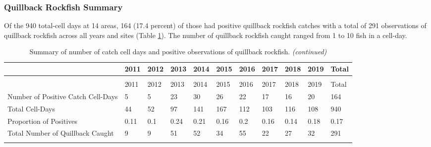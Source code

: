 \documentclass[11pt,
  english,
  a4paper,
]{article}
\begin{document}
\leavevmode\tagmcend\tagstructend\par


\hypertarget{quillback-rockfish-summary}{%
\subsubsection{Quillback Rockfish Summary}\label{quillback-rockfish-summary}}

\leavevmode\tagmcend\tagstructend


Of the 940 total-cell days at 14 areas, 164 (17.4 percent) of those had positive quillback rockfish catches with a total of 291 observations of quillback rockfish across all years and sites (Table \ref{tab:table-2}). The number of quillback rockfish caught ranged from 1 to 10 fish in a cell-day.

\leavevmode\tagmcend\tagstructend\par

\begingroup\fontsize{10}{12}\selectfont
\begingroup\fontsize{10}{12}\selectfont

\begin{longtable}[t]{>{\raggedright\arraybackslash}p{2.2cm}llllllllll}
\caption{\label{tab:table-2}Summary of number of catch cell days and positive observations of quillback rockfish.}\\
\toprule
 & 2011 & 2012 & 2013 & 2014 & 2015 & 2016 & 2017 & 2018 & 2019 & Total\\
\midrule
\endfirsthead
\caption[]{\label{tab:table-2}Summary of number of catch cell days and positive observations of quillback rockfish. \textit{(continued)}}\\
\toprule
 & 2011 & 2012 & 2013 & 2014 & 2015 & 2016 & 2017 & 2018 & 2019 & Total\\
\midrule
\endhead

\endfoot
\bottomrule
\endlastfoot
Number of Positive Catch Cell-Days & 5 & 5 & 23 & 30 & 26 & 22 & 17 & 16 & 20 & 164\\
Total Cell-Days & 44 & 52 & 97 & 141 & 167 & 112 & 103 & 116 & 108 & 940\\
Proportion of Positives & 0.11 & 0.1 & 0.24 & 0.21 & 0.16 & 0.2 & 0.16 & 0.14 & 0.18 & 0.17\\
Total Number of Quillback Caught & 9 & 9 & 51 & 52 & 34 & 55 & 22 & 27 & 32 & 291\\*
\end{longtable}
\leavevmode\tagmcend\tagstructend\par
\endgroup{}
\endgroup{}
\end{document}
